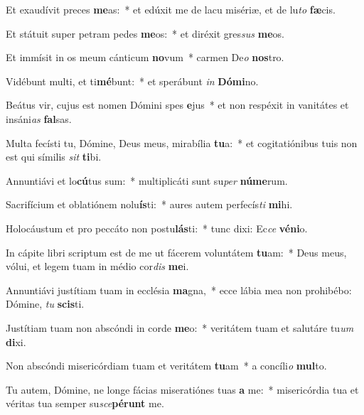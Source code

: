 \item Et exaudívit preces \textbf{me}as:~* et edúxit me de lacu misériæ, et de lu\textit{to} \textbf{fæ}cis.

\item Et státuit super petram pedes \textbf{me}os:~* et diréxit gres\textit{sus} \textbf{me}os.

\item Et immísit in os meum cánticum \textbf{no}vum~* carmen De\textit{o} \textbf{nos}tro.

\item Vidébunt multi, et ti\textbf{mé}bunt:~* et sperábunt \textit{in} \textbf{Dó}\textbf{mi}no.

\item Beátus vir, cujus est nomen Dómini spes \textbf{e}jus~* et non respéxit in vanitátes et insáni\textit{as} \textbf{fal}sas.

\item Multa fecísti tu, Dómine, Deus meus, mirabília \textbf{tu}a:~* et cogitatiónibus tuis non est qui símilis \textit{sit} \textbf{ti}bi.

\item Annuntiávi et lo\textbf{cú}tus sum:~* multiplicáti sunt su\textit{per} \textbf{nú}\textbf{me}rum.

\item Sacrifícium et oblatiónem nolu\textbf{ís}ti:~* aures autem perfecís\textit{ti} \textbf{mi}hi.

\item Holocáustum et pro peccáto non postu\textbf{lás}ti:~* tunc dixi: Ec\textit{ce} \textbf{vé}\textbf{ni}o.

\item In cápite libri scriptum est de me ut fácerem voluntátem \textbf{tu}am:~* Deus meus, vólui, et legem tuam in médio cor\textit{dis} \textbf{me}i.

\item Annuntiávi justítiam tuam in ecclésia \textbf{ma}gna,~* ecce lábia mea non prohibébo: Dómine, \textit{tu} \textbf{scis}ti.

\item Justítiam tuam non abscóndi in corde \textbf{me}o:~* veritátem tuam et salutáre tu\textit{um} \textbf{di}xi.

\item Non abscóndi misericórdiam tuam et veritátem \textbf{tu}am~* a concíli\textit{o} \textbf{mul}to.

\item Tu autem, Dómine, ne longe fácias miseratiónes tuas \textbf{a} me:~* misericórdia tua et véritas tua semper su\textit{sce}\textbf{pé}\textbf{runt} me.

